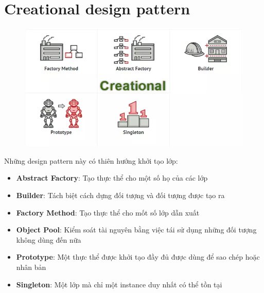 \section{Creational design pattern}
\begin{figure}[!htb]
    \centering
    \includegraphics[width=\textwidth]{fig/Introduction/creational.png}
\end{figure}\newpage
Những design pattern này có thiên hướng khởi tạo lớp:
\begin{itemize}
    \item \textbf{Abstract Factory}: Tạo thực thể cho một số họ của các lớp
    \item \textbf{Builder}: Tách biệt cách dựng đối tượng và đối tượng được tạo ra
    \item \textbf{Factory Method}: Tạo thực thể cho mốt số lớp dẫn xuất
    \item \textbf{Object Pool}: Kiểm soát tài nguyên bằng việc tái sử dụng những đối tượng không dùng đến nữa
    \item \textbf{Prototype}: Một thực thể được khởi tạo đầy đủ được dùng để sao chép hoặc nhân bản
    \item \textbf{Singleton}: Một lớp mà chỉ một instance duy nhất có thể tồn tại
\end{itemize}

